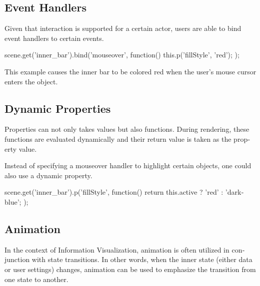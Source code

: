 \begin{english}
\subsection{Event Handlers}

Given that interaction is supported for a certain actor, users are able to bind event handlers to certain events.

\begin{program}
\begin{CppSourceCode}
scene.get('inner_bar').bind('mouseover', function() {
  this.p('fillStyle', 'red');
});
\end{CppSourceCode}
\end{program}

\SuperPar This example causes the inner bar to be colored red when the user's mouse cursor enters the object.

\subsection{Dynamic Properties}

Properties can not only takes values but also functions. During rendering, these functions are evaluated dynamically and their return value is taken as the property value.

\SuperPar Instead of specifying a mouseover handler to highlight certain objects, one could also use a dynamic property.


\begin{program}
\begin{CppSourceCode}
scene.get('inner_bar').p('fillStyle', function() {
  return this.active ? 'red' : 'darkblue';
});
\end{CppSourceCode}
\end{program}


\subsection{Animation}

In the context of Information Visualization, animation is often utilized in conjunction with state transitions. In other words, when the inner state (either data or user settings) changes, animation can be used to emphasize the transition from one state to another.


\end{english}
